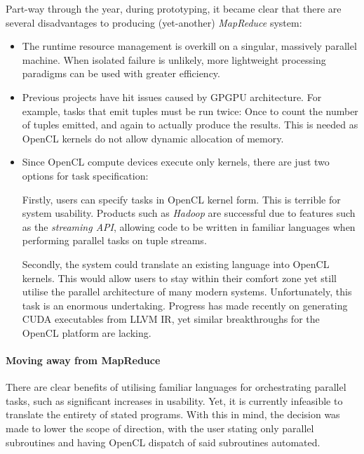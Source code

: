 Part-way through the year, during prototyping, it became clear that there are several disadvantages to producing (yet-another) \emph{MapReduce} system:
\begin{itemize}
\item The runtime resource management is overkill on a singular, massively parallel machine. When isolated failure is unlikely, more lightweight processing paradigms can be used with greater efficiency.

\item Previous projects have hit issues caused by \ac{GPGPU} architecture. For example, tasks that emit tuples must be run twice: Once to count the number of tuples emitted, and again to actually produce the results. This is needed as \ac{OpenCL} kernels do not allow dynamic allocation of memory.

\item Since \ac{OpenCL} compute devices execute only kernels, there are just two options for task specification:

Firstly, users can specify tasks in \ac{OpenCL} kernel form. This is terrible for system usability. Products such as \emph{Hadoop} are successful due to features such as the \emph{streaming \ac{API}}, allowing code to be written in familiar languages when performing parallel tasks on tuple streams.

Secondly, the system could translate an existing language into \ac{OpenCL} kernels. This would allow users to stay within their comfort zone yet still utilise the parallel architecture of many modern systems. Unfortunately, this task is an enormous undertaking. Progress has made recently on generating \ac{CUDA} executables from LLVM \ac{IR}, yet similar breakthroughs for the \ac{OpenCL} platform are lacking.
\end{itemize}

\paragraph*{Moving away from MapReduce}
There are clear benefits of utilising familiar languages for orchestrating parallel tasks, such as significant increases in usability.
Yet, it is currently infeasible to translate the entirety of stated programs.
With this in mind, the decision was made  to lower the scope of direction, with the user stating only parallel subroutines and having \ac{OpenCL} dispatch of said subroutines automated.

